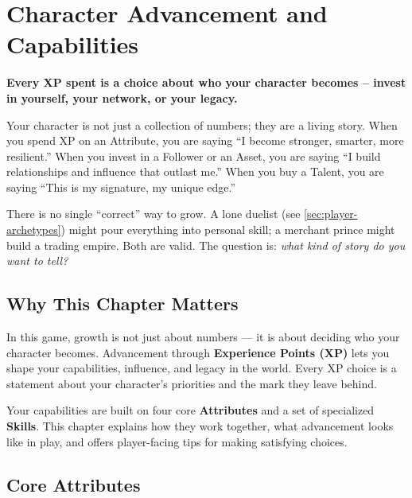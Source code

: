 \chapter{Character Advancement and Capabilities}
\label{ch:advancement}

\begin{tcolorbox}[colback=blue!5!white, colframe=blue!75!black, title=Philosophy of Growth, fonttitle=\bfseries,breakable]
\textbf{Every XP spent is a choice about who your character becomes -- invest in yourself, your network, or your legacy.}

Your character is not just a collection of numbers; they are a living story. When you spend XP on an Attribute, you are saying ``I become stronger, smarter, more resilient.'' When you invest in a Follower or an Asset, you are saying ``I build relationships and influence that outlast me.'' When you buy a Talent, you are saying ``This is my signature, my unique edge.''

\medskip
\noindent There is no single ``correct'' way to grow. A lone duelist (see \ref{sec:player-archetypes}) might pour everything into personal skill; a merchant prince might build a trading empire. Both are valid. The question is: \textit{what kind of story do you want to tell?}
\end{tcolorbox}

\section*{Why This Chapter Matters}

In this game, growth is not just about numbers --- it is about deciding who your
character becomes. Advancement through \textbf{Experience Points (XP)} lets you
shape your capabilities, influence, and legacy in the world. Every XP choice is
a statement about your character's priorities and the mark they leave behind.

Your capabilities are built on four core \textbf{Attributes} and a set of
specialized \textbf{Skills}. This chapter explains how they work together,
what advancement looks like in play, and offers player-facing tips for making
satisfying choices.

\section{Core Attributes}
\label{sec:core-attributes}

